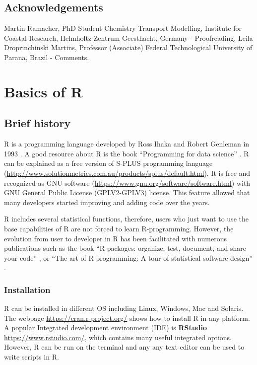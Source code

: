 \documentclass[12pt,graybox,envcountchap,sectrefs]{krantz}
\theoremstyle{definition}
\theoremstyle{definition}
\theoremstyle{definition}
\theoremstyle{remark}
\begin{document}
\section{Acknowledgements}\label{acknowledgements}

Martin Ramacher, PhD Student Chemistry Transport Modelling, Institute
for Coastal Research, Helmholtz-Zentrum Geesthacht, Germany -
Proofreading. Leila Droprinchinski Martins, Professor (Associate)
Federal Technological University of Parana, Brazil - Comments.

\chapter{Basics of R}\label{basic}

\section{Brief history}\label{brief-history}

R is a programming language developed by Ross Ihaka and Robert Genleman
in 1993 \citep{ihaka1996r}. A good resource about R is the book
``Programming for data science'' \citep{peng2015r}. R can be explained
as a free version of S-PLUS programming language
(\url{http://www.solutionmetrics.com.au/products/splus/default.html}).
It is free and recognized as GNU software
(\url{https://www.gnu.org/software/software.html}) with GNU General
Public License (GPLV2-GPLV3) license. This feature allowed that many
developers started improving and adding code over the years.

R includes several statistical functions, therefore, users who just want
to use the base capabilities of R are not forced to learn R-programming.
However, the evolution from user to developer in R has been facilitated
with numerous publications such as the book ``R packages: organize,
test, document, and share your code'' \citep{wickham2015r}, or ``The art
of R programming: A tour of statistical software design''
\citep{matloff2011art}.

\subsection{Installation}\label{installation-1}

R can be installed in different OS including Linux, Windows, Mac and
Solaris. The webpage \url{https://cran.r-project.org/} shows how to
install R in any platform. A popular Integrated development environment
(IDE) is \textbf{RStudio} \url{https://www.rstudio.com/}, which contains
many useful integrated options. However, R can be run on the terminal
and any any text editor can be used to write scripts in R.
\end{document}
